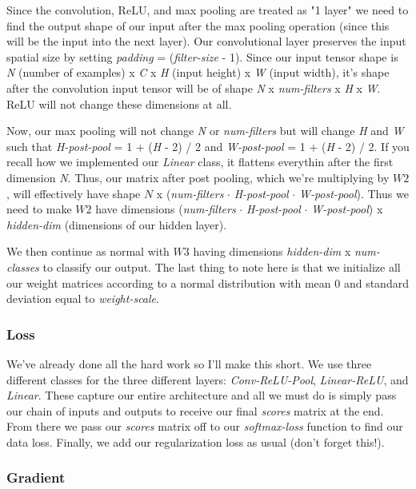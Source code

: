 \documentclass[12pt]{article}
\begin{document}
Since the convolution, ReLU, and max pooling are treated as "1 layer" we need to find the output shape of our 
input after the max pooling operation (since this will be the input into the next layer). Our convolutional layer 
preserves the input spatial size by setting \emph{padding} = (\emph{filter-size} - 1). Since our input tensor shape is 
\emph{N} (number of examples) x \emph{C} x \emph{H} (input height) x \emph{W} (input width), it's shape after the convolution 
input tensor will be of shape \emph{N} x \emph{num-filters} x \emph{H} x \emph{W}. ReLU will not change these dimensions at 
all. 

Now, our max pooling will not change \emph{N} or \emph{num-filters} but will change \emph{H} and \emph{W} such 
that \emph{H-post-pool} = 1 + (\emph{H} - 2) / 2 and \emph{W-post-pool} = 1 + (\emph{H} - 2) / 2. If you recall how 
we implemented our \emph{Linear} class, it flattens everythin after the first dimension \emph{N}. Thus, our matrix after
post pooling, which we're multiplying by $W2$, will effectively have shape $N$ x (\emph{num-filters} $\cdot$ \emph{H-post-pool} 
$\cdot$ \emph{W-post-pool}). Thus we need to make $W2$ have dimensions (\emph{num-filters} $\cdot$ \emph{H-post-pool} 
$\cdot$ \emph{W-post-pool}) x \emph{hidden-dim} (dimensions of our hidden layer). 

We then continue as normal with $W3$ having dimensions \emph{hidden-dim} x \emph{num-classes} to classify our output. The last 
thing to note here is that we initialize all our weight matrices according to a normal distribution with mean 0 and 
standard deviation equal to \emph{weight-scale}.

\subsubsection{Loss}

We've already done all the hard work so I'll make this short. We use three different classes for the three different layers: 
\emph{Conv-ReLU-Pool}, \emph{Linear-ReLU}, and \emph{Linear}. These capture our entire architecture and all we must 
do is simply pass our chain of inputs and outputs to receive our final \emph{scores} matrix at the end. From there we pass our 
\emph{scores} matrix off to our \emph{softmax-loss} function to find our data loss. Finally, we add our regularization loss 
as usual (don't forget this!). 

\subsubsection{Gradient}
\end{document}
